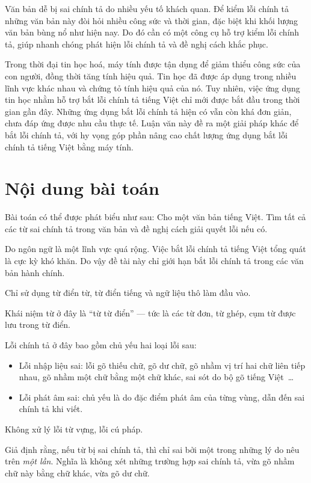 \documentclass[a4paper,oneside,14pt]{extbook} %
\begin{document}
Văn bản dễ bị sai chính tả do nhiều yếu tố khách quan. Để kiểm lỗi
chính tả những văn bản này đòi hỏi nhiều công sức và thời gian, đặc
biệt khi khối lượng văn bản bùng nổ như hiện nay. Do đó cần có một
công cụ hỗ trợ kiểm lỗi chính tả, giúp nhanh chóng phát hiện lỗi chính
tả và đề nghị cách khắc phục.

Trong thời đại tin học hoá, máy tính được tận dụng để giảm thiểu công
sức của con người, đồng thời tăng tính hiệu quả. Tin học đã được áp
dụng trong nhiều lĩnh vực khác nhau và chứng tỏ tính hiệu quả của
nó. Tuy nhiên, việc ứng dụng tin học nhằm hỗ trợ bắt lỗi
chính tả tiếng Việt chỉ mới được bắt đầu trong thời gian gần
đây. Những ứng dụng bắt lỗi chính tả hiện có vẫn còn khá đơn
giản, chưa đáp ứng được nhu cầu thực tế. Luận văn này đề ra một giải
pháp khác để bắt lỗi chính tả, với hy vọng góp phần nâng cao chất
lượng ứng dụng bắt lỗi chính tả tiếng Việt bằng máy tính.

\section{Nội dung bài toán}

Bài toán có thể được phát biểu như sau:
Cho một văn bản tiếng Việt. Tìm tất cả các từ sai chính tả trong văn bản
và đề nghị cách giải quyết lỗi nếu có.


Do ngôn ngữ là một lĩnh vực quá rộng. Việc bắt lỗi chính tả tiếng Việt
tổng quát là cực kỳ khó khăn. Do vậy đề tài này chỉ giới hạn bắt lỗi
chính tả trong các văn bản hành chính.

Chỉ sử dụng từ điển từ, từ điển tiếng và ngữ liệu thô làm đầu vào.

Khái niệm từ ở đây là ``từ từ điển'' --- tức là các từ đơn, từ ghép,
cụm từ được lưu trong từ điển. 

Lỗi chính tả ở đây bao gồm chủ yếu hai loại lỗi sau:
\begin{itemize}
\item Lỗi nhập liệu sai: lỗi gõ thiếu chữ, gõ dư chữ, gõ nhầm vị trí
  hai chữ liên tiếp nhau, gõ nhầm một chữ bằng một chữ khác, sai sót
  do bộ gõ tiếng Việt~\ldots{}
\item Lỗi phát âm sai: chủ yếu là do đặc điểm phát âm của từng vùng,
  dẫn đến sai chính tả khi viết.
\end{itemize}

Không xử lý lỗi từ vựng, lỗi cú pháp.

Giả định rằng, nếu từ bị sai chính tả, thì chỉ sai bởi một trong những
lý do nêu trên {\em một lần}. Nghĩa là không xét những trường hợp sai
chính tả, vừa gõ nhầm chữ này bằng chữ khác, vừa gõ dư chữ.
\end{document}
